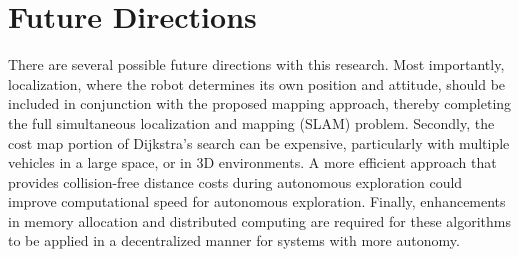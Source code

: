 \section{Future Directions}

There are several possible future directions with this research. Most importantly, localization, where the robot determines its own position and attitude, should be included in conjunction with the proposed mapping approach, thereby completing the full simultaneous localization and mapping (SLAM) problem. Secondly, the cost map portion of Dijkstra's search can be expensive, particularly with multiple vehicles in a large space, or in 3D environments. A more efficient approach that provides collision-free distance costs during autonomous exploration could improve computational speed for autonomous exploration. Finally, enhancements in memory allocation and distributed computing are required for these algorithms to be applied in a decentralized manner for systems with more autonomy.
 


